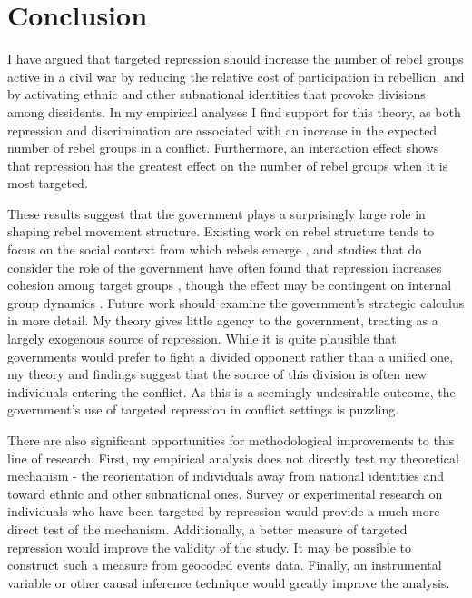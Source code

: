 \documentclass[12pt,]{book}
\begin{document}
\section{Conclusion}\label{conclusion}

I have argued that targeted repression should increase the number of
rebel groups active in a civil war by reducing the relative cost of
participation in rebellion, and by activating ethnic and other
subnational identities that provoke divisions among dissidents. In my
empirical analyses I find support for this theory, as both repression
and discrimination are associated with an increase in the expected
number of rebel groups in a conflict. Furthermore, an interaction effect
shows that repression has the greatest effect on the number of rebel
groups when it is most targeted.

These results suggest that the government plays a surprisingly large
role in shaping rebel movement structure. Existing work on rebel
structure tends to focus on the social context from which rebels emerge
\citep{Staniland2014}, and studies that do consider the role of the
government have often found that repression increases cohesion among
target groups \citep{Simmel1955}, though the effect may be contingent on
internal group dynamics \citep{McLauchlin2012}. Future work should
examine the government's strategic calculus in more detail. My theory
gives little agency to the government, treating as a largely exogenous
source of repression. While it is quite plausible that governments would
prefer to fight a divided opponent rather than a unified one, my theory
and findings suggest that the source of this division is often new
individuals entering the conflict. As this is a seemingly undesirable
outcome, the government's use of targeted repression in conflict
settings is puzzling.

There are also significant opportunities for methodological improvements
to this line of research. First, my empirical analysis does not directly
test my theoretical mechanism - the reorientation of individuals away
from national identities and toward ethnic and other subnational ones.
Survey or experimental research on individuals who have been targeted by
repression would provide a much more direct test of the mechanism.
Additionally, a better measure of targeted repression would improve the
validity of the study. It may be possible to construct such a measure
from geocoded events data. Finally, an instrumental variable or other
causal inference technique would greatly improve the analysis.
\end{document}
